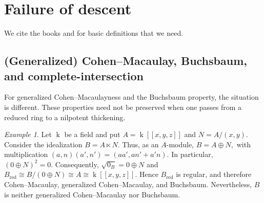 \documentclass[10pt,a4paper]{amsart}
\newtheorem{lemma}[theorem]{Lemma}
\theoremstyle{definition}
\theoremstyle{remark}
\newtheorem{remark}[theorem]{Remark}
\newtheorem{example}[theorem]{Example}
\newcommand{\kk}{\operatorname{k}}
\begin{document}
 

\section{Failure of descent}
We cite the books \cite{BH} and \cite{MP} for basic definitions that we need.
\subsection{(Generalized) Cohen--Macaulay, Buchsbaum, and complete-intersection}
For generalized Cohen--Macaulayness and the Buchsbaum property, the
situation is different. These properties need not be preserved when
one passes from a reduced ring to a nilpotent thickening.

\begin{example}
	Let \(\kk\) be a field and put
 $
	A=\kk[[x,y,z]]
	$ 	and
 $
	N=A/(x,y).
	$ 	Consider the idealization
 $
	B=A\ltimes N.
	$ Thus, as an \(A\)-module,
 $
	B=A\oplus N,
 $
 with multiplication
 $
	(a,n)(a',n')=(aa',an'+a'n).
 $
 In particular,
 $
	(0\oplus N)^2=0.
 $
 	Consequently,
 $
	\sqrt{0_B}=0\oplus N
	$ 
and
 $
	B_{\mathrm{red}}
	\cong B/(0\oplus N)
	\cong A
	\cong \kk[[x,y,z]].
	$ Hence \(B_{\mathrm{red}}\) is regular, and therefore Cohen--Macaulay,
	generalized Cohen--Macaulay, and Buchsbaum.
 Nevertheless, \(B\) is neither generalized Cohen--Macaulay nor
	Buchsbaum.
\end{example}
\end{document}
